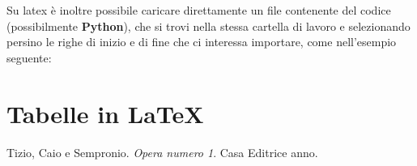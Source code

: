 \documentclass[preprint, twocolumn, 5p, lefttitle]{elsarticle} %
\begin{document}
\medskip
Su latex è inoltre possibile caricare direttamente un file contenente del codice (possibilmente \textbf{Python}), che si trovi nella stessa cartella di lavoro e selezionando persino le righe di inizio e di fine che ci interessa importare, come nell'esempio seguente:




\section{Tabelle in \LaTeX}





\begin{thebibliography}{9}
Tizio, Caio e Sempronio.
\textit{Opera numero 1}.  
Casa Editrice anno.

\end{thebibliography}
\end{document}
